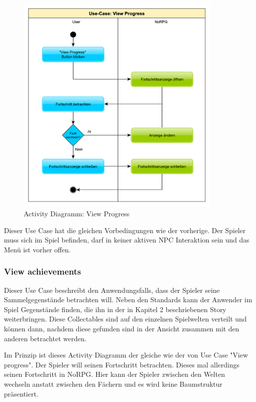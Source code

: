 			\begin{figure}[htbp]
				\centering 
				\label{umlViewProgess}
				\includegraphics[width=10cm]{pics/ViewProgress.pdf}
				\caption{Activity Diagramm: View Progress}
			\end{figure}
	
			Dieser Use Case hat die gleichen Vorbedingungen wie der vorherige. Der Spieler muss sich im Spiel befinden, darf in keiner aktiven \ac{NPC} Interaktion sein und das Menü ist vorher offen.
	
		\subsubsection{View achievements}
			Dieser Use Case beschreibt den Anwendungsfalls, dass der Spieler seine Sammelgegenstände betrachten will. Neben den Standards kann der Anwender im Spiel Gegenstände finden, die ihn in der in Kapitel 2 beschriebenen Story weiterbringen. Diese Collectables sind auf den einzelnen Spielwelten verteilt und können dann, nachdem diese gefunden sind in der Ansicht zusammen mit den anderen betrachtet werden.
			
			Im Prinzip ist dieses Activity Diagramm der gleiche wie der von Use Case "View progress". Der Spieler will seinen Fortschritt betrachten. Dieses mal allerdings seinen Fortschritt in NoRPG. Hier kann der Spieler zwischen den Welten wechseln anstatt zwischen den Fächern und es wird keine Baumstruktur präsentiert.
			
